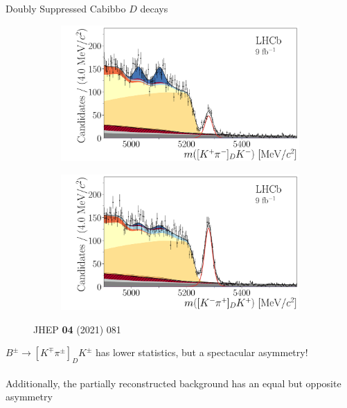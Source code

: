 \documentclass[dvipsnames]{beamer}
\begin{document}
\begin{frame}{Doubly Suppressed Cabibbo $D$ decays}
  \begin{figure}
    \centering
    \begin{subfigure}{0.5\textwidth}
      \includegraphics[width = 1.0\textwidth]{Plots/B2DK_D2Kpi_Minus.pdf}
    \end{subfigure}%
    \begin{subfigure}{0.5\textwidth}
      \includegraphics[width = 1.0\textwidth]{Plots/B2DK_D2Kpi_Plus.pdf}
    \end{subfigure}
    \caption*{\tiny JHEP \textbf{04} (2021) 081}
  \end{figure}
  \vspace{-0.5cm}
  \begin{center}
    \Large $B^\pm\to[K^\mp\pi^\pm]_DK^\pm$ has lower statistics, but a spectacular asymmetry!\\~\\
    \large Additionally, the partially reconstructed background has an equal but opposite asymmetry
  \end{center}
\end{frame}
\end{document}
